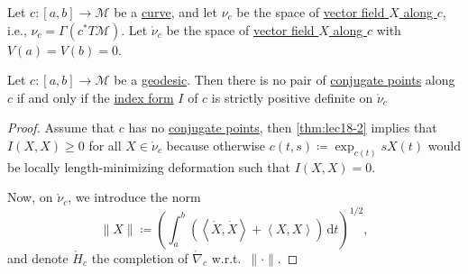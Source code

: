 Let \(c\colon [a, b] \to \mathcal{M} \) be a \hyperref[def:curve]{curve}, and let \(\nu _c\) be the space of \hyperref[def:vector-field-along-curve]{vector field \(X\) along \(c\)}, i.e., \(\nu _c = \Gamma (c^{\ast} T \mathcal{M} )\). Let \(\mathring{\nu }_c\) be the space of \hyperref[def:vector-field-along-curve]{vector field \(X\) along \(c\)} with \(V(a) = V(b) = 0\).

\begin{lemma}
	Let \(c\colon [a, b] \to \mathcal{M} \) be a \hyperref[def:geodesic]{geodesic}. Then there is no pair of \hyperref[def:conjugate-point]{conjugate points} along \(c\) if and only if the \hyperref[def:index-form]{index form} \(I\) of \(c\) is strictly positive definite on \(\mathring{\nu}_c\)
\end{lemma}
\begin{proof}
	Assume that \(c\) has no \hyperref[def:conjugate-point]{conjugate points}, then \autoref{thm:lec18-2} implies that
	\(I(X, X) \geq 0\) for all \(X \in \mathring{\nu }_c\) because otherwise \(c(t, s)\coloneqq \exp _{c(t)} s X(t)\) would be locally length-minimizing deformation such that \(I(X, X) = 0\).

	Now, on \(\mathring{\nu }_c\), we introduce the norm
	\[
		\lVert X \rVert \coloneqq \left( \int_{a}^{b} \left( \left\langle \dot{X} , \dot{X} \right\rangle + \left\langle X, X \right\rangle  \right)  \,\mathrm{d}t \right) ^{1 / 2},
	\]
	and denote \(\mathring{H}_c\) the completion of \(\mathring{\nabla }_c\) w.r.t.\ \(\lVert \cdot \rVert \).
\end{proof}